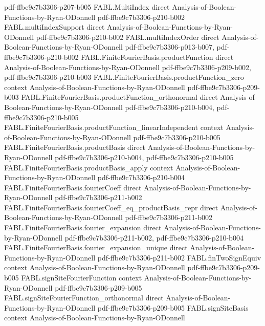 \begin{theorem}
  {pdf-ffbe9c7b3306-p207-b005}
\proofstep
  {FABL.MultiIndex}
  {direct}
  {Analysis-of-Boolean-Functions-by-Ryan-ODonnell}
  {pdf-ffbe9c7b3306-p210-b002}
\proofstep
  {FABL.multiIndexSupport}
  {direct}
  {Analysis-of-Boolean-Functions-by-Ryan-ODonnell}
  {pdf-ffbe9c7b3306-p210-b002}
\proofstep
  {FABL.multiIndexOrder}
  {direct}
  {Analysis-of-Boolean-Functions-by-Ryan-ODonnell}
  {pdf-ffbe9c7b3306-p013-b007,
    pdf-ffbe9c7b3306-p210-b002}
\proofstep
  {FABL.FiniteFourierBasis.productFunction}
  {direct}
  {Analysis-of-Boolean-Functions-by-Ryan-ODonnell}
  {pdf-ffbe9c7b3306-p209-b002,
    pdf-ffbe9c7b3306-p210-b003}
\proofstep
  {FABL.FiniteFourierBasis.productFunction_zero}
  {context}
  {Analysis-of-Boolean-Functions-by-Ryan-ODonnell}
  {pdf-ffbe9c7b3306-p209-b003}
\proofstep
  {FABL.FiniteFourierBasis.productFunction_orthonormal}
  {direct}
  {Analysis-of-Boolean-Functions-by-Ryan-ODonnell}
  {pdf-ffbe9c7b3306-p210-b004,
    pdf-ffbe9c7b3306-p210-b005}
\proofstep
  {FABL.FiniteFourierBasis.productFunction_linearIndependent}
  {context}
  {Analysis-of-Boolean-Functions-by-Ryan-ODonnell}
  {pdf-ffbe9c7b3306-p210-b005}
\proofstep
  {FABL.FiniteFourierBasis.productBasis}
  {direct}
  {Analysis-of-Boolean-Functions-by-Ryan-ODonnell}
  {pdf-ffbe9c7b3306-p210-b004,
    pdf-ffbe9c7b3306-p210-b005}
\proofstep
  {FABL.FiniteFourierBasis.productBasis_apply}
  {context}
  {Analysis-of-Boolean-Functions-by-Ryan-ODonnell}
  {pdf-ffbe9c7b3306-p210-b004}
\proofstep
  {FABL.FiniteFourierBasis.fourierCoeff}
  {direct}
  {Analysis-of-Boolean-Functions-by-Ryan-ODonnell}
  {pdf-ffbe9c7b3306-p211-b002}
\proofstep
  {FABL.FiniteFourierBasis.fourierCoeff_eq_productBasis_repr}
  {direct}
  {Analysis-of-Boolean-Functions-by-Ryan-ODonnell}
  {pdf-ffbe9c7b3306-p211-b002}
\proofstep
  {FABL.FiniteFourierBasis.fourier_expansion}
  {direct}
  {Analysis-of-Boolean-Functions-by-Ryan-ODonnell}
  {pdf-ffbe9c7b3306-p211-b002,
    pdf-ffbe9c7b3306-p210-b004}
\proofstep
  {FABL.FiniteFourierBasis.fourier_expansion_unique}
  {direct}
  {Analysis-of-Boolean-Functions-by-Ryan-ODonnell}
  {pdf-ffbe9c7b3306-p211-b002}
\proofstep
  {FABL.finTwoSignEquiv}
  {context}
  {Analysis-of-Boolean-Functions-by-Ryan-ODonnell}
  {pdf-ffbe9c7b3306-p209-b005}
\proofstep
  {FABL.signSiteFourierFunction}
  {context}
  {Analysis-of-Boolean-Functions-by-Ryan-ODonnell}
  {pdf-ffbe9c7b3306-p209-b005}
\proofstep
  {FABL.signSiteFourierFunction_orthonormal}
  {direct}
  {Analysis-of-Boolean-Functions-by-Ryan-ODonnell}
  {pdf-ffbe9c7b3306-p209-b005}
\proofstep
  {FABL.signSiteBasis}
  {context}
  {Analysis-of-Boolean-Functions-by-Ryan-ODonnell}

\end{theorem}
